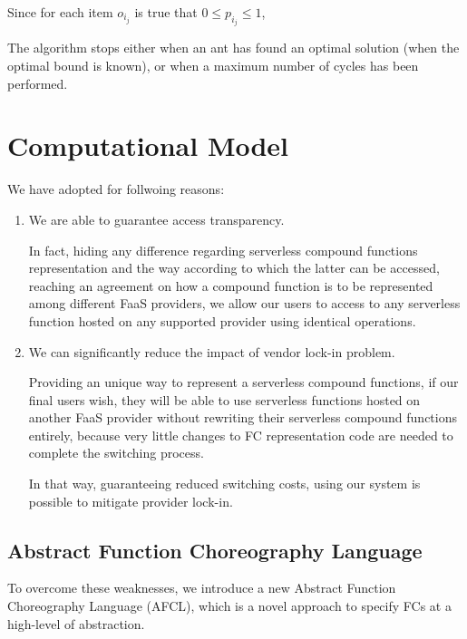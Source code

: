 \documentclass[12pt,a4paper]{report}
\begin{document}
Since for each item $o_{i_j}$ is true that $0 \leq p_{i_j} \leq 1$, 

The algorithm stops either when an ant has found an optimal solution (when the optimal bound is known), or when a maximum number of cycles has been performed.



\newpage


\chapter{Computational Model}





We have adopted for follwoing reasons:

\begin{enumerate}
	\item We are able to guarantee access transparency. 
	
	In fact, hiding any difference regarding serverless compound functions representation and the way according to which the latter can be accessed, reaching an agreement on how a compound function is to be represented among different FaaS providers, we allow our users to access to any serverless function hosted on any supported provider using identical operations.
	
	\item We can significantly reduce the impact of vendor lock-in problem. 
	
	Providing an unique way to represent a serverless compound functions, if our final users wish, they will be able to use serverless functions hosted on another FaaS provider without rewriting their serverless compound functions entirely, because very little changes to FC representation code are needed to complete the switching process. 
	
	In that way, guaranteeing reduced switching costs, using our system is possible to mitigate provider lock-in.
	
\end{enumerate}

\section{Abstract Function Choreography Language}

To overcome these weaknesses, we introduce a new Abstract
Function Choreography Language (AFCL), which is a novel approach
to specify FCs at a high-level of abstraction. 
\end{document}
